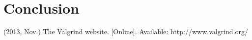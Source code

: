 \documentclass[conference]{IEEEtran}
\begin{document}





\section{Conclusion}
\label{sec:conclusion}






% 
% 







%
%
%


\begin{thebibliography}{1}
% 
(2013, Nov.) The Valgrind website. [Online]. Available: http://www.valgrind.org/
% 
\end{thebibliography}




\end{document}
